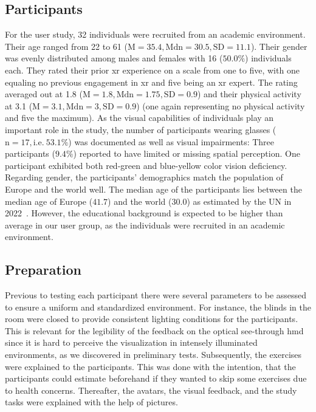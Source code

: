 \subsection{Participants}
For the user study, 32 individuals were recruited from an academic environment. Their age ranged from 22 to 61 (\(\mathrm{M} = 35.4, \mathrm{Mdn} = 30.5, \mathrm{SD} = 11.1\)). Their gender was evenly distributed among males and females with 16 (\(50.0\%\)) individuals each. They rated their prior \acrshort{xr} experience on a scale from one to five, with one equaling no previous engagement in \acrshort{xr} and five being an \acrshort{xr} expert. The rating averaged out at 1.8 (\(\mathrm{M}=1.8, \mathrm{Mdn} = 1.75, \mathrm{SD} = 0.9\)) and their physical activity at 3.1 (\(\mathrm{M}=3.1, \mathrm{Mdn} = 3, \mathrm{SD} = 0.9\)) (one again representing no physical activity and five the maximum). As the visual capabilities of individuals play an important role in the study, the number of participants wearing glasses (\(\mathrm{n} = 17, \mathrm{i.e.}~53.1\%\)) was documented as well as visual impairments: Three participants (\(9.4\%\)) reported to have limited or missing spatial perception. One participant exhibited both red-green and blue-yellow color vision deficiency. Regarding gender, the participants' demographics match the population of Europe and the world well. The median age of the participants lies between the median age of Europe (\(41.7\)) and the world (\(30.0\)) as estimated by the UN in 2022~\cite{united2022world}. However, the educational background is expected to be higher than average in our user group, as the individuals were recruited in an academic environment.

\subsection{Preparation}
Previous to testing each participant there were several parameters to be assessed to ensure a uniform and standardized environment. For instance, the blinds in the room were closed to provide consistent lighting conditions for the participants. This is relevant for the legibility of the feedback on the optical see-through \acrshort{hmd} since it is hard to perceive the visualization in intensely illuminated environments, as we discovered in preliminary tests. Subsequently, the exercises were explained to the participants. This was done with the intention, that the participants could estimate beforehand if they wanted to skip some exercises due to health concerns. Thereafter, the avatars, the visual feedback, and the study tasks were explained with the help of pictures.

